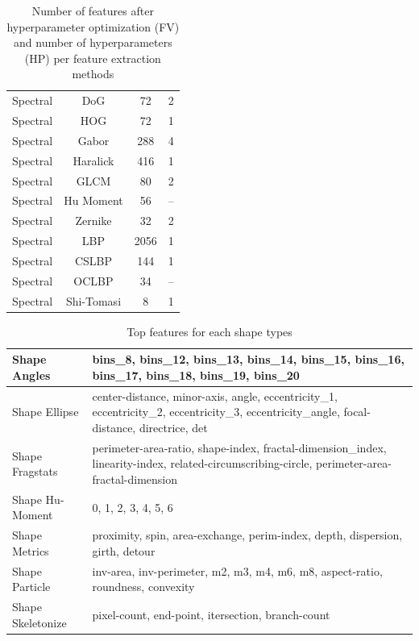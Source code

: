 \documentclass[../thesis.tex]{subfiles}
\begin{document}
\begin{table}[H]
\begin{tabular}{|c|c|c|c|}
            Spectral & DoG			&   72 & 2 \\
            Spectral & HOG			&   72 & 1 \\
            Spectral & Gabor		&  288 & 4 \\
            Spectral & Haralick		&  416 & 1 \\
            Spectral & GLCM			&   80 & 2 \\
            Spectral & Hu Moment	&   56 & -- \\
            Spectral & Zernike		&   32 & 2 \\
            Spectral & LBP			& 2056 & 1 \\
            Spectral & CSLBP		&  144 & 1 \\
            Spectral & OCLBP		&   34 & -- \\
            Spectral & Shi-Tomasi	&    8 & 1 \\
            \hline
        \end{tabular}
        \caption{Number of features after hyperparameter optimization (FV) and number of hyperparameters (HP) per feature extraction methods}
        \label{tab:optimized_features}
    \end{table}
    \vfill
    \begin{table}[H]
        \begin{tabularx}{\linewidth}{|l|X|}
            \hline
            Shape Angles & bins\_8, bins\_12, bins\_13, bins\_14, bins\_15, bins\_16, bins\_17, bins\_18, bins\_19, bins\_20 \\ \hline
            
            Shape Ellipse & center-distance, minor-axis, angle, eccentricity\_1, eccentricity\_2, eccentricity\_3, eccentricity\_angle, focal-distance, directrice, det \\ \hline
            
            Shape Fragstats & perimeter-area-ratio, shape-index, fractal-dimension\_index, linearity-index, related-circumscribing-circle, perimeter-area-fractal-dimension \\ \hline
            
            Shape Hu-Moment & 0, 1, 2, 3, 4, 5, 6 \\ \hline
            
            Shape Metrics & proximity, spin, area-exchange, perim-index, depth, dispersion, girth, detour \\ \hline
            
            Shape Particle & inv-area, inv-perimeter, m2, m3, m4, m6, m8, aspect-ratio, roundness, convexity \\ \hline
            
            Shape Skeletonize & pixel-count, end-point, itersection, branch-count \\ \hline
        \end{tabularx}
        \caption{Top features for each shape types}
        \label{tab:feature-name-shape}
    \end{table}
\end{document}
